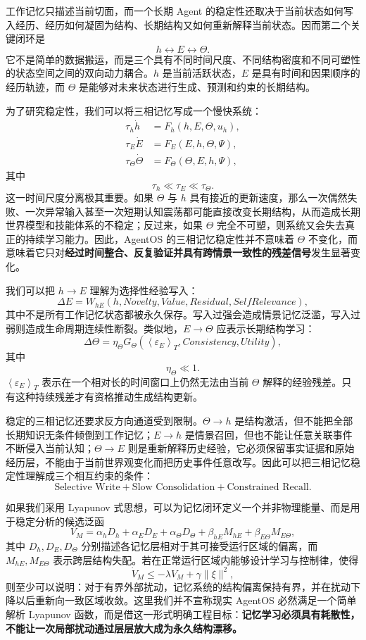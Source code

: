 工作记忆只描述当前切面，而一个长期 Agent 的稳定性还取决于当前状态如何写入经历、经历如何凝固为结构、长期结构又如何重新解释当前状态。因而第二个关键闭环是
\[
\boxed{
h
\leftrightarrow
E
\leftrightarrow
\Theta.
}
\]
它不是简单的数据搬运，而是三个具有不同时间尺度、不同结构密度和不同可塑性的状态空间之间的双向动力耦合。$h$ 是当前活跃状态，$E$ 是具有时间和因果顺序的经历轨迹，而 $\Theta$ 是能够对未来状态进行生成、预测和约束的长期结构。

为了研究稳定性，我们可以将三相记忆写成一个慢快系统：
\[
\begin{aligned}
\tau_h\dot h
&=
F_h(h,E,\Theta,u_h),\\
\tau_E\dot E
&=
F_E(E,h,\Theta,\Psi),\\
\tau_\Theta\dot\Theta
&=
F_\Theta(\Theta,E,h,\Psi),
\end{aligned}
\]
其中
\[
\tau_h\ll\tau_E\ll\tau_\Theta.
\]
这一时间尺度分离极其重要。如果 $\Theta$ 与 $h$ 具有接近的更新速度，那么一次偶然失败、一次异常输入甚至一次短期认知震荡都可能直接改变长期结构，从而造成长期世界模型和技能体系的不稳定；反过来，如果 $\Theta$ 完全不可塑，则系统又会失去真正的持续学习能力。因此，AgentOS 的三相记忆稳定性并不意味着 $\Theta$ 不变化，而意味着它只对\textbf{经过时间整合、反复验证并具有跨情景一致性的残差信号}发生显著变化。

我们可以把 $h\rightarrow E$ 理解为选择性经验写入：
\[
\Delta E
=
W_{hE}
\left(
h,
Novelty,
Value,
Residual,
SelfRelevance
\right),
\]
其中不是所有工作记忆状态都被永久保存。写入过强会造成情景记忆泛滥，写入过弱则造成生命周期连续性断裂。类似地，$E\rightarrow\Theta$ 应表示长期结构学习：
\[
\Delta\Theta
=
\eta_\Theta
G_\Theta
\left(
\left\langle
\varepsilon_E
\right\rangle_T,
Consistency,
Utility
\right),
\]
其中
\[
\eta_\Theta\ll1.
\]
$\left\langle\varepsilon_E\right\rangle_T$ 表示在一个相对长的时间窗口上仍然无法由当前 $\Theta$ 解释的经验残差。只有这种持续残差才有资格推动生成结构更新。

稳定的三相记忆还要求反方向通道受到限制。$\Theta\rightarrow h$ 是结构激活，但不能把全部长期知识无条件倾倒到工作记忆；$E\rightarrow h$ 是情景召回，但也不能让任意关联事件不断侵入当前认知；$\Theta\rightarrow E$ 则是重新解释历史经验，它必须保留事实证据和原始经历层，不能由于当前世界观变化而把历史事件任意改写。因此可以把三相记忆稳定性理解成三个相互约束的条件：
\[
\boxed{
\text{Selective Write}
+
\text{Slow Consolidation}
+
\text{Constrained Recall}.
}
\]

如果我们采用 Lyapunov 式思想，可以为记忆闭环定义一个并非物理能量、而是用于稳定分析的候选泛函
\[
V_M
=
\alpha_h D_h
+
\alpha_E D_E
+
\alpha_\Theta D_\Theta
+
\beta_{hE}M_{hE}
+
\beta_{E\Theta}M_{E\Theta},
\]
其中 $D_h,D_E,D_\Theta$ 分别描述各记忆层相对于其可接受运行区域的偏离，而 $M_{hE},M_{E\Theta}$ 表示跨层结构失配。若在正常运行区域内能够设计学习与控制律，使得
\[
\dot V_M
\leq
-\lambda V_M
+
\gamma\|\xi\|^2,
\]
则至少可以说明：对于有界外部扰动，记忆系统的结构偏离保持有界，并在扰动下降以后重新向一致区域收敛。这里我们并不宣称现实 AgentOS 必然满足一个简单解析 Lyapunov 函数，而是借这一形式明确工程目标：\textbf{记忆学习必须具有耗散性，不能让一次局部扰动通过层层放大成为永久结构漂移。}


